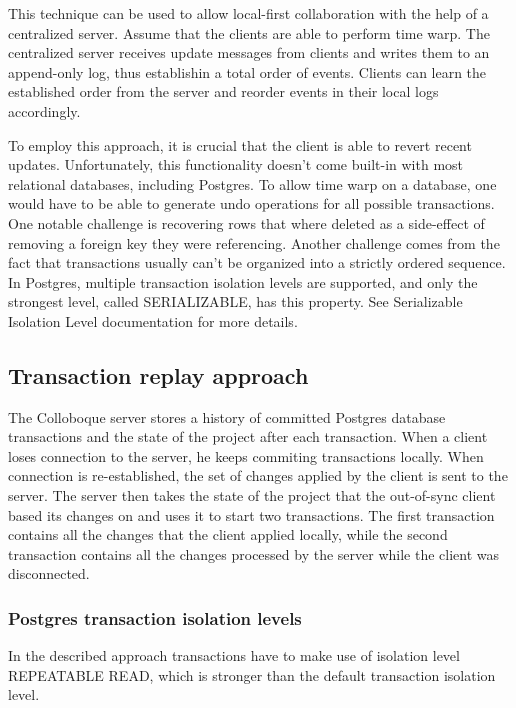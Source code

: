 \documentclass[a4paper, 11pt, oneside]{article}
\theoremstyle{definition}
\begin{document}
This technique can be used to allow local-first collaboration with the help of a centralized server. Assume that the clients are able to perform time warp. The centralized server receives update messages from clients and writes them to an append-only log, thus establishin a total order of events. Clients can learn the established order from the server and reorder events in their local logs accordingly.

To employ this approach, it is crucial that the client is able to revert recent updates. Unfortunately, this functionality doesn't come built-in with most relational databases, including Postgres. To allow time warp on a database, one would have to be able to generate undo operations for all possible transactions. One notable challenge is recovering rows that where deleted as a side-effect of removing a foreign key they were referencing. Another challenge comes from the fact that transactions usually can't be organized into a strictly ordered sequence. In Postgres, multiple transaction isolation levels are supported, and only the strongest level, called SERIALIZABLE, has this property. See Serializable Isolation Level documentation \cite{tisolevel} for more details.

\subsection{Transaction replay approach}\label{sec:transactreplay}

The Colloboque server stores a history of committed Postgres database transactions and the state of the project after each transaction. When a client loses connection to the server, he keeps commiting transactions locally. When connection is re-established, the set of changes applied by the client is sent to the server. The server then takes the state of the project that the out-of-sync client based its changes on and uses it to start two transactions. The first transaction contains all the changes that the client applied locally, while the second transaction contains all the changes processed by the server while the client was disconnected. 

\subsubsection{Postgres transaction isolation levels} 
In the described approach transactions have to make use of isolation level REPEATABLE READ, which is stronger than the default transaction isolation level.
\end{document}
